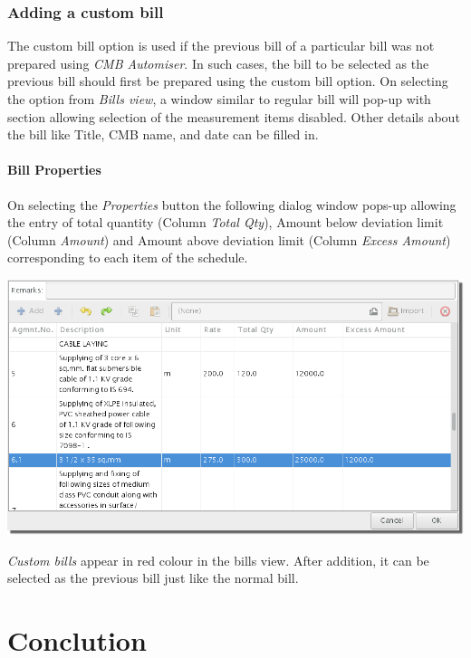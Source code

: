 \documentclass[twoside,a4paper]{refart}
\begin{document}
	 \subsubsection{Adding a custom bill}
	 
	 \attention The custom bill option is used if the previous bill of a particular bill was not prepared using \emph{CMB Automiser}. In such cases, the bill to be selected as the previous bill should first be prepared using the custom bill option. On selecting the option from \emph{Bills view}, a window similar to regular bill will pop-up with section allowing selection of the measurement items disabled. Other details about the bill like Title, CMB name, and date can be filled in.\\
	 
	 \paragraph{Bill Properties}
	 
	 On selecting the \emph{Properties} button the following dialog window pops-up allowing the entry of total quantity (Column \emph{Total Qty}), Amount below deviation limit (Column \emph{Amount}) and Amount above deviation limit  (Column \emph{Excess Amount}) corresponding to each item of the schedule.
	
	 \begin{maxipage}
	 	\includegraphics[width=1\linewidth]{screenshots/window_bill_cust_prop.png}
	 \end{maxipage}
	 
	 \emph{Custom bills} appear in red colour in the bills view. After addition, it can be selected as the previous bill just like the normal bill.
	 
	 \section{Conclution}
	 
\end{document}
